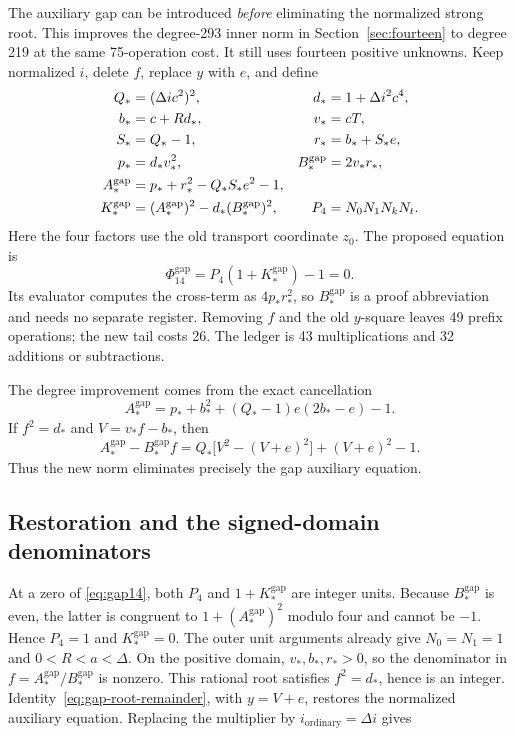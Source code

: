 The auxiliary gap can be introduced \emph{before} eliminating the
normalized strong root. This improves the degree-293 inner norm in
Section~\ref{sec:fourteen} to degree 219 at the same 75-operation
cost. It still uses fourteen positive unknowns. Keep normalized \(i\),
delete \(f\), replace \(y\) with \(e\), and define
\begin{align}
 Q_*&=(\Delta ic^2)^2,& d_*&=1+\Delta i^2c^4,\notag\\
 b_*&=c+Rd_*,&v_*&=cT,\notag\\
 S_*&=Q_*-1,&r_*&=b_*+S_*e,\notag\\
 p_*&=d_*v_*^2,&B_*^{\mathrm{gap}}&=2v_*r_*,\notag\\
 A_*^{\mathrm{gap}}
   &=p_*+r_*^2-Q_*S_*e^2-1,\notag\\
 K_*^{\mathrm{gap}}
   &=(A_*^{\mathrm{gap}})^2-d_*(B_*^{\mathrm{gap}})^2,
   &P_4&=N_0N_1N_kN_t.
 \label{eq:gap-root-data}
\end{align}
Here the four factors use the old transport coordinate \(z_0\).
The proposed equation is
\begin{equation}\boxed{
 \Phi_{14}^{\mathrm{gap}}
    =P_4(1+K_*^{\mathrm{gap}})-1=0.}
 \label{eq:gap14}
\end{equation}
Its evaluator computes the cross-term as \(4p_*r_*^2\), so
\(B_*^{\mathrm{gap}}\) is a proof abbreviation and needs no separate
register. Removing \(f\) and the old \(y\)-square leaves 49 prefix
operations; the new tail costs 26. The ledger is 43 multiplications
and 32 additions or subtractions.

The degree improvement comes from the exact cancellation
\begin{equation}
 A_*^{\mathrm{gap}}
  =p_*+b_*^2+(Q_*-1)e(2b_*-e)-1.
 \label{eq:gap-root-cancellation}
\end{equation}
If \(f^2=d_*\) and \(V=v_*f-b_*\), then
\begin{equation}
 A_*^{\mathrm{gap}}-B_*^{\mathrm{gap}}f
  =Q_*\bigl[V^2-(V+e)^2\bigr]+(V+e)^2-1.
 \label{eq:gap-root-remainder}
\end{equation}
Thus the new norm eliminates precisely the gap auxiliary equation.

\subsection{Restoration and the signed-domain denominators}

At a zero of \eqref{eq:gap14}, both \(P_4\) and
\(1+K_*^{\mathrm{gap}}\) are integer units. Because
\(B_*^{\mathrm{gap}}\) is even, the latter is congruent to
\(1+(A_*^{\mathrm{gap}})^2\) modulo four and cannot be \(-1\).
Hence \(P_4=1\) and \(K_*^{\mathrm{gap}}=0\). The outer unit
arguments already give \(N_0=N_1=1\) and
\(0<R<a<\Delta\). On the positive domain,
\(v_*,b_*,r_*>0\), so the denominator in
\(f=A_*^{\mathrm{gap}}/B_*^{\mathrm{gap}}\) is nonzero.
This rational root satisfies \(f^2=d_*\), hence is an integer.
Identity~\eqref{eq:gap-root-remainder}, with \(y=V+e\), restores
the normalized auxiliary equation. Replacing the multiplier by
\(i_{\mathrm{ordinary}}=\Delta i\) gives

